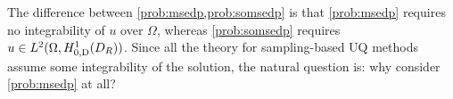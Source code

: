 %
%

\label{rem:whyone}

The difference between \cref{prob:msedp,prob:somsedp} is that \cref{prob:msedp} requires no integrability of $u$ over $\Omega$, whereas \cref{prob:somsedp} requires $u \in \LtOHozDDRnormal$. Since all the theory for sampling-based UQ methods assume some integrability of the solution, the natural question is: why consider \cref{prob:msedp} at all?

